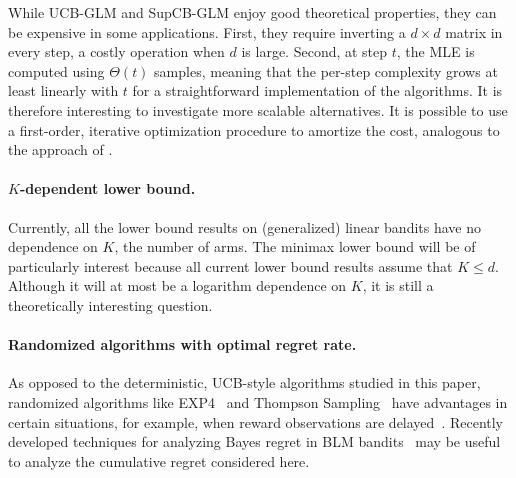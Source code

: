 While UCB-GLM and SupCB-GLM enjoy good theoretical properties, they can be expensive in some applications.  First, they require inverting a $d\times d$ matrix in every step, a costly operation when $d$ is large.  Second, at step $t$, the MLE is computed using $\Theta(t)$ samples, meaning that the per-step complexity grows at least linearly with $t$ for a straightforward implementation of the algorithms.  It is therefore interesting to investigate more scalable alternatives.  It is possible to use a first-order, iterative optimization procedure to amortize the cost, analogous to the approach of \citet{agarwal2014taming}.
%

\paragraph{$K$-dependent lower bound.}
Currently, all the lower bound results on (generalized) linear bandits have no dependence on $K$, the number of arms. The minimax lower bound will be of particularly interest because all current lower bound results assume that $K \le d$. Although it will at most be a logarithm dependence on $K$, it is still a theoretically interesting question.

\paragraph{Randomized algorithms with optimal regret rate.}
As opposed to the deterministic, UCB-style algorithms studied in this paper, randomized algorithms like EXP4~\cite{auer2002nonstochastic} and Thompson Sampling~\cite{Thompson33Likelihood} have advantages in certain situations, for example, when reward observations are delayed~\cite{Chapelle12Empirical}.  Recently developed techniques for analyzing Bayes regret in BLM bandits~\cite{Russo14Learning} may be useful to analyze the cumulative regret considered here.
